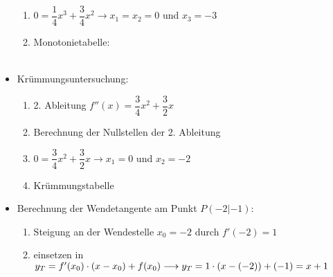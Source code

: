 \documentclass[a4paper,twocolumn,10pt]{onepgnote}
\begin{document}
\begin{itemize}
\begin{enumerate}
    \item  $0 = \dfrac{1}{4} x^3 +\dfrac{3}{4} x^2 \longrightarrow x_1 =x_2 = 0$ und $x_3= -3$\\
\item Monotonietabelle:\\
\\
    \end{enumerate}
    \item Krümmungsuntersuchung:\\
    \begin{enumerate}
    \item 2. Ableitung $f''(x) = \dfrac{3}{4} x^2 + \dfrac{3}{2} x$\\
    \item Berechnung der Nullstellen der 2. Ableitung\\
    \item $0 = \dfrac{3}{4} x^2 +\dfrac{3}{2} x \longrightarrow x_1 = 0$ und $x_2= -2$\\
    \item Krümmungstabelle\\
    \end{enumerate}
    \item Berechnung der Wendetangente am Punkt $P(-2|-1)$: \\
    \begin{enumerate}
    \item Steigung an der Wendestelle $x_0 = -2$ durch $f'(-2) = 1$\\
    \item einsetzen in $y_T = f'(x_0)\cdot(x-x_0) + f(x_0)\\ \longrightarrow y_T = 1\cdot \left(x-\left(-2\right)\right) +(-1)= x+1$

\end{enumerate}
\end{itemize}
\end{document}

